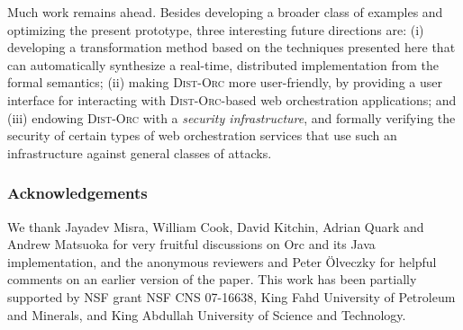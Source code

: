 \documentclass{eptcs}
\begin{document}
Much work remains ahead. Besides developing a broader class of examples and
optimizing the present prototype, three interesting future directions are: (i) developing a transformation method based on the techniques presented here that can automatically synthesize a real-time, distributed implementation from the formal semantics; (ii) making \textsc{Dist-Orc} more user-friendly, by providing a user interface
for interacting with \textsc{Dist-Orc}-based web orchestration applications; and (iii) endowing
\textsc{Dist-Orc} with a \emph{security infrastructure}, and formally verifying the security of certain
types of web orchestration services that use such an infrastructure against general classes of
attacks.


\subsubsection*{Acknowledgements}
We thank Jayadev Misra, William Cook, David Kitchin, Adrian Quark and Andrew Matsuoka for very fruitful discussions on Orc and its Java implementation, and the anonymous reviewers and Peter \"{O}lveczky for helpful comments on an earlier version of the paper. This work has been partially supported by NSF grant NSF CNS 07-16638, King Fahd University of Petroleum and Minerals, and King Abdullah University of Science and Technology.




\end{document}
